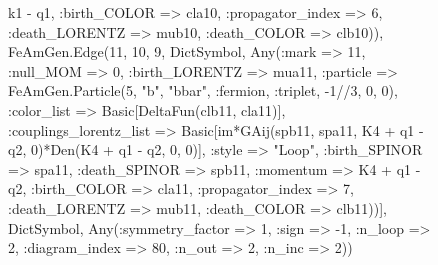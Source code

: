 \documentclass{revtex4}
\begin{document}
\begin{figure}[!htb]
\begin{center}
{k1 - q1, :birth_COLOR => cla10, :propagator_index => 6, :death_LORENTZ => mub10, :death_COLOR => clb10)), FeAmGen.Edge(11, 10, 9, Dict{Symbol, Any}(:mark => 11, :null_MOM => 0, :birth_LORENTZ => mua11, :particle => FeAmGen.Particle(5, "b", "bbar", :fermion, :triplet, -1//3, 0, 0), :color_list => Basic[DeltaFun(clb11, cla11)], :couplings_lorentz_list => Basic[im*GAij(spb11, spa11, K4 + q1 - q2, 0)*Den(K4 + q1 - q2, 0, 0)], :style => "Loop", :birth_SPINOR => spa11, :death_SPINOR => spb11, :momentum => K4 + q1 - q2, :birth_COLOR => cla11, :propagator_index => 7, :death_LORENTZ => mub11, :death_COLOR => clb11))], Dict{Symbol, Any}(:symmetry_factor => 1, :sign => -1, :n_loop => 2, :diagram_index => 80, :n_out => 2, :n_inc => 2)) 
}
\end{center}
\end{figure}
\end{document}
